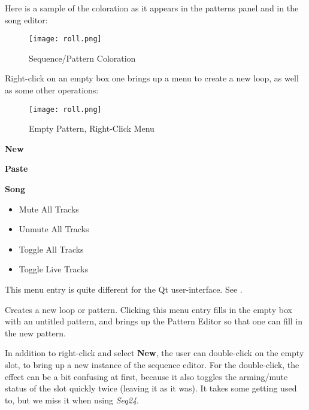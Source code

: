    Here is a sample of the coloration as it appears in the patterns panel and
   in the song editor:

\begin{figure}[H]
   \centering 
   \texttt{[image: roll.png]}
   \caption{Sequence/Pattern Coloration}
   \label{fig:pattern_window_sequence_coloration}
\end{figure}

   Right-click on an empty box one brings up a menu to create
   a new loop, as well as some other operations:

\begin{figure}[H]
   \centering 
   \texttt{[image: roll.png]}
   \caption{Empty Pattern, Right-Click Menu}
   \label{fig:pattern_window_empty_right_click}
\end{figure}

   \begin{enumber}
      \item \textbf{New}
      \item \textbf{Paste}
      \item \textbf{Song}
      \begin{itemize}
         \item {Mute All Tracks}
         \item {Unmute All Tracks}
         \item {Toggle All Tracks}
         \item {Toggle Live Tracks}
      \end{itemize}
   \end{enumber}

   This menu entry is quite different for the Qt user-interface.
   See .

   \setcounter{ItemCounter}{0}      %

   Creates a new loop or pattern.
   Clicking this menu entry fills in the empty box with an untitled
   pattern, and brings up the Pattern Editor
   so that one can fill in the new pattern.

   In addition to right-click and select \textbf{New}, the user can
   double-click on the empty slot, to bring up a new instance of the sequence
   editor.  For the double-click, the effect can be a bit confusing at first,
   because it also toggles the arming/mute status of the slot
   quickly twice (leaving it as it was).  It takes some getting
   used to, but we miss it when using \textsl{Seq24}.

